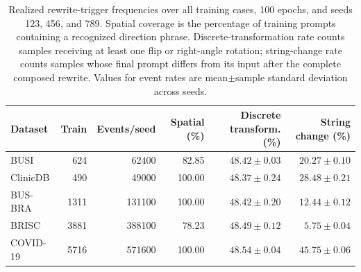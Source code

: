 \begin{table}[htbp]
\centering
\caption{Realized \methodname{} rewrite-trigger frequencies over all training cases, 100 epochs, and seeds 123, 456, and 789. Spatial coverage is the percentage of training prompts containing a recognized direction phrase. Discrete-transformation rate counts samples receiving at least one flip or right-angle rotation; string-change rate counts samples whose final prompt differs from its input after the complete composed rewrite. Values for event rates are mean$\pm$sample standard deviation across seeds.}
\label{tab:supp_realized_trigger}
\scriptsize
\setlength{\tabcolsep}{3.2pt}
\begin{tabular}{@{}lrrrrr@{}}
\toprule
Dataset & Train & Events/seed & Spatial (\%) & Discrete transform. (\%) & String change (\%) \\
\midrule
BUSI & 624 & 62400 & 82.85 & $48.42\pm0.03$ & $20.27\pm0.10$ \\
ClinicDB & 490 & 49000 & 100.00 & $48.37\pm0.24$ & $28.48\pm0.21$ \\
BUS-BRA & 1311 & 131100 & 100.00 & $48.42\pm0.20$ & $12.44\pm0.12$ \\
BRISC & 3881 & 388100 & 78.23 & $48.49\pm0.12$ & $5.75\pm0.04$ \\
COVID-19 & 5716 & 571600 & 100.00 & $48.54\pm0.04$ & $45.75\pm0.06$ \\
\bottomrule
\end{tabular}
\end{table}
